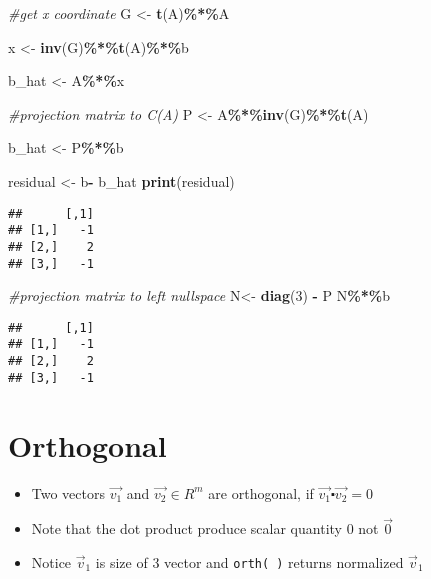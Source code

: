 \documentclass[
]{article}
\newenvironment{Shaded}{\begin{snugshade}}{\end{snugshade}}
\newcommand{\CommentTok}[1]{\textcolor[rgb]{0.56,0.35,0.01}{\textit{#1}}}
\newcommand{\DecValTok}[1]{\textcolor[rgb]{0.00,0.00,0.81}{#1}}
\newcommand{\FunctionTok}[1]{\textcolor[rgb]{0.13,0.29,0.53}{\textbf{#1}}}
\newcommand{\NormalTok}[1]{#1}
\newcommand{\OtherTok}[1]{\textcolor[rgb]{0.56,0.35,0.01}{#1}}
\newcommand{\SpecialCharTok}[1]{\textcolor[rgb]{0.81,0.36,0.00}{\textbf{#1}}}
\begin{document}
\begin{Shaded}
\begin{Highlighting}[]
\CommentTok{\#get x coordinate}
\NormalTok{G }\OtherTok{\textless{}{-}} \FunctionTok{t}\NormalTok{(A)}\SpecialCharTok{\%*\%}\NormalTok{A}

\NormalTok{x }\OtherTok{\textless{}{-}} \FunctionTok{inv}\NormalTok{(G)}\SpecialCharTok{\%*\%}\FunctionTok{t}\NormalTok{(A)}\SpecialCharTok{\%*\%}\NormalTok{b}

\NormalTok{b\_hat }\OtherTok{\textless{}{-}}\NormalTok{ A}\SpecialCharTok{\%*\%}\NormalTok{x}

\CommentTok{\#projection matrix to C(A)}
\NormalTok{P }\OtherTok{\textless{}{-}}\NormalTok{ A}\SpecialCharTok{\%*\%}\FunctionTok{inv}\NormalTok{(G)}\SpecialCharTok{\%*\%}\FunctionTok{t}\NormalTok{(A)}

\NormalTok{b\_hat }\OtherTok{\textless{}{-}}\NormalTok{ P}\SpecialCharTok{\%*\%}\NormalTok{b}

\NormalTok{residual }\OtherTok{\textless{}{-}}\NormalTok{ b}\SpecialCharTok{{-}}\NormalTok{ b\_hat}
\FunctionTok{print}\NormalTok{(residual)}
\end{Highlighting}
\end{Shaded}

\begin{verbatim}
##      [,1]
## [1,]   -1
## [2,]    2
## [3,]   -1
\end{verbatim}

\begin{Shaded}
\begin{Highlighting}[]
\CommentTok{\#projection matrix to left nullspace}
\NormalTok{N}\OtherTok{\textless{}{-}} \FunctionTok{diag}\NormalTok{(}\DecValTok{3}\NormalTok{) }\SpecialCharTok{{-}}\NormalTok{ P}
\NormalTok{N}\SpecialCharTok{\%*\%}\NormalTok{b}
\end{Highlighting}
\end{Shaded}

\begin{verbatim}
##      [,1]
## [1,]   -1
## [2,]    2
## [3,]   -1
\end{verbatim}

\break

\hypertarget{orthogonal}{%
\section{Orthogonal}\label{orthogonal}}

\begin{itemize}
\item
  Two vectors \(\vec{v_1}\) and \(\vec{v_2} \in R^m\) are orthogonal, if
  \(\vec{v_1} \centerdot \vec{v_2}=0\)
\item
  Note that the dot product produce scalar quantity 0 not \(\vec{0}\)
\item
  Notice \(\vec{v}_1\) is size of 3 vector and \texttt{orth(\ )} returns
  normalized \(\vec{v}_1\)
\end{itemize}
\end{document}
